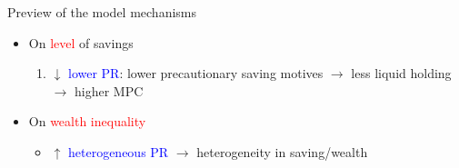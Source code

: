\documentclass{beamer}
\begin{document}
\begin{frame}{Preview of the model mechanisms}
	\begin{itemize}
		\item On \textcolor{red}{level} of savings
		\begin{enumerate}
			\item $\downarrow$ \textcolor{blue}{lower PR}: lower precautionary saving motives $\rightarrow$ less liquid holding $\rightarrow$ higher MPC
		\end{enumerate}
	\pause
		\item On \textcolor{red}{wealth inequality}
		\begin{itemize}
			\item 	$\uparrow$ \textcolor{blue}{heterogeneous PR} $\rightarrow$ heterogeneity in saving/wealth
		\end{itemize}
	\end{itemize}
\end{frame}
\end{document}
